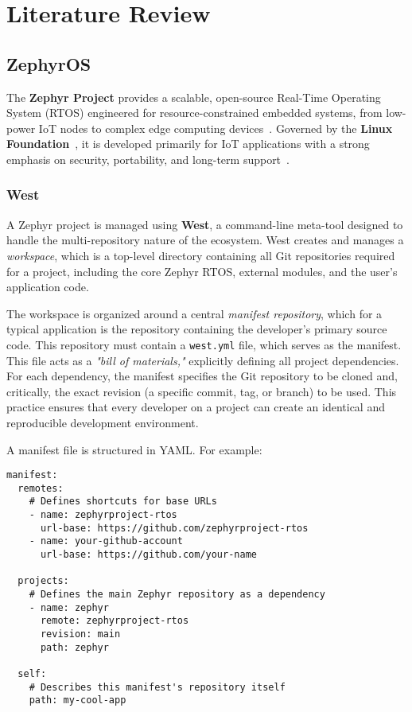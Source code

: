\chapter{Literature Review}

\section{ZephyrOS}

The \textbf{Zephyr Project} provides a scalable, open-source Real-Time Operating System (RTOS) engineered for resource-constrained embedded systems, from low-power IoT nodes to complex edge computing devices~\cite{source}. Governed by the \textbf{Linux Foundation}~\cite{source}, it is developed primarily for IoT applications with a strong emphasis on security, portability, and long-term support~\cite{source}.

\subsection{West}

A Zephyr project is managed using \textbf{West}, a command-line meta-tool designed to handle the multi-repository nature of the ecosystem. West creates and manages a \textit{workspace}, which is a top-level directory containing all Git repositories required for a project, including the core Zephyr RTOS, external modules, and the user's application code.

The workspace is organized around a central \textit{manifest repository}, which for a typical application is the repository containing the developer's primary source code. This repository must contain a \texttt{west.yml} file, which serves as the manifest. This file acts as a \textit{"bill of materials,"} explicitly defining all project dependencies. For each dependency, the manifest specifies the Git repository to be cloned and, critically, the exact revision (a specific commit, tag, or branch) to be used. This practice ensures that every developer on a project can create an identical and reproducible development environment.

A manifest file is structured in YAML. For example:

\begin{verbatim}
manifest:
  remotes:
    # Defines shortcuts for base URLs
    - name: zephyrproject-rtos
      url-base: https://github.com/zephyrproject-rtos
    - name: your-github-account
      url-base: https://github.com/your-name
      
  projects:
    # Defines the main Zephyr repository as a dependency
    - name: zephyr
      remote: zephyrproject-rtos
      revision: main
      path: zephyr

  self:
    # Describes this manifest's repository itself
    path: my-cool-app
\end{verbatim}

